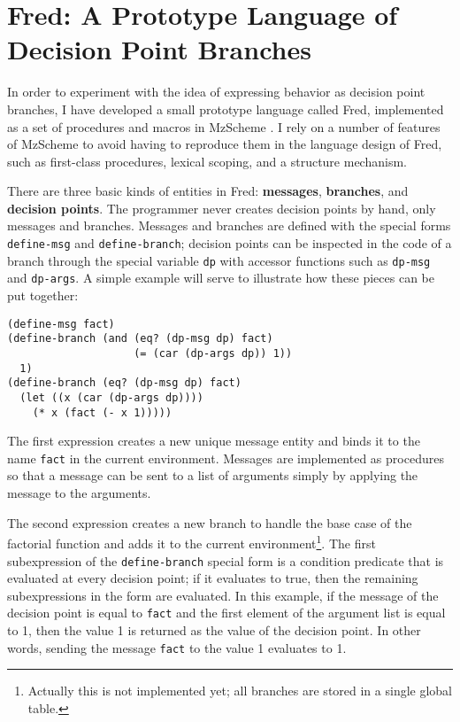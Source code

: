 \documentclass{article}
\newcommand{\defn}[1]{\textbf{#1}}
\newcommand{\code}[1]{\texttt{#1}}
\begin{document}
\section{Fred: A Prototype Language of Decision Point Branches}
\label{section:fred}

In order to experiment with the idea of expressing behavior as
decision point branches, I have developed a small prototype language
called Fred, implemented as a set of procedures and macros in MzScheme
\cite{MzScheme}.  I rely on a number of features of MzScheme to avoid
having to reproduce them in the language design of Fred, such as
first-class procedures, lexical scoping, and a structure mechanism.

There are three basic kinds of entities in Fred: \defn{messages},
\defn{branches}, and \defn{decision points}.  The programmer never
creates decision points by hand, only messages and branches.  Messages 
and branches are defined with the special forms \code{define-msg} and
\code{define-branch}; decision points can be inspected in the code of a
branch through the special variable \code{dp} with accessor functions
such as \code{dp-msg} and \code{dp-args}.  A simple example will serve 
to illustrate how these pieces can be put together:

\begin{verbatim}
(define-msg fact)
(define-branch (and (eq? (dp-msg dp) fact)
                    (= (car (dp-args dp)) 1))
  1)
(define-branch (eq? (dp-msg dp) fact)
  (let ((x (car (dp-args dp))))
    (* x (fact (- x 1)))))
\end{verbatim}

The first expression creates a new unique message entity and binds it
to the name \code{fact} in the current environment.  Messages are
implemented as procedures so that a message can be sent to a list of
arguments simply by applying the message to the arguments.

The second expression creates a new branch to handle the base case of
the factorial function and adds it to the current
environment\footnote{Actually this is not implemented yet; all
branches are stored in a single global table.}.  The first subexpression
of the \code{define-branch} special form is a condition predicate that
is evaluated at every decision point; if it evaluates to true, then
the remaining subexpressions in the form are evaluated.  In this example,
if the message of the decision point is equal to \code{fact} and the
first element of the argument list is equal to 1, then the value 1 is
returned as the value of the decision point.  In other words, sending
the message \code{fact} to the value 1 evaluates to 1.
\end{document}

